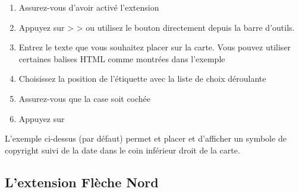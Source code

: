 \begin{enumerate}
\item Assurez-vous d'avoir activé l'extension
\item Appuyez sur  >  >  ou utilisez le bouton  directement depuis la barre d'outils.
\item Entrez le texte que vous souhaitez placer sur la carte. Vous pouvez
  utiliser certaines balises HTML comme montrées dans l'exemple
\item Choisissez la position de l'étiquette avec la liste de choix déroulante\\ 
\item Assurez-vous que la case  soit cochée
\item Appuyez sur  
\end{enumerate}

L'exemple ci-dessus (par défaut) permet et placer et d'afficher un symbole de
copyright suivi de la date dans le coin inférieur droit de la carte.

\subsection{L'extension Flèche Nord}\label{northarrow}


